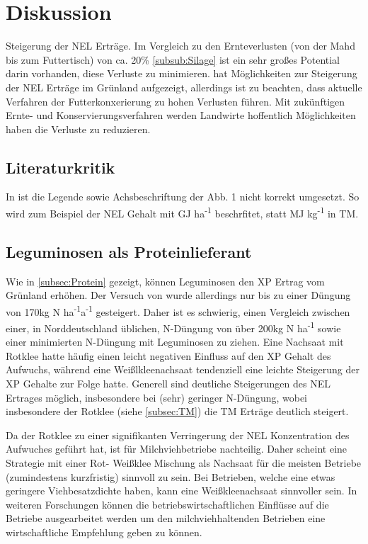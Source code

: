 
\section{Diskussion}
\label{sec:Disukussion}
Steigerung der \ac{NEL} Erträge.
Im Vergleich zu den Ernteverlusten (von der Mahd bis zum Futtertisch) von ca. 20\% \cref{subsub:Silage} ist ein sehr großes Potential darin vorhanden, diese Verluste zu minimieren.
\textcite[33-36]{weggler2050leguminosen} hat Möglichkeiten zur Steigerung der \ac{NEL} Erträge im Grünland aufgezeigt, allerdings ist zu beachten, dass aktuelle Verfahren der Futterkonxerierung zu hohen Verlusten führen.
Mit zukünftigen Ernte- und Konservierungsverfahren werden Landwirte hoffentlich Möglichkeiten haben die Verluste zu reduzieren.

\subsection{Literaturkritik}
\label{sub:kritik}
In \textcite[35]{weggler2050leguminosen} ist die Legende sowie Achsbeschriftung der Abb. 1 nicht korrekt umgesetzt.
So wird zum Beispiel der \ac{NEL} Gehalt mit GJ ha\textsuperscript{-1} beschrfitet, statt MJ kg\textsuperscript{-1} in \ac{TM}.

\subsection{Leguminosen als Proteinlieferant}
\label{sub:leguminosen}
Wie in \ref{subsec:Protein} gezeigt, können Leguminosen den \ac{XP} Ertrag vom Grünland erhöhen.
Der Versuch von \textcite[33-36]{weggler2050leguminosen} wurde allerdings nur bis zu einer Düngung von 170kg N ha\textsuperscript{-1}a\textsuperscript{-1} gesteigert.
Daher ist es schwierig, einen Vergleich zwischen einer, in Norddeutschland üblichen, N-Düngung von über 200kg N ha\textsuperscript{-1} sowie einer minimierten N-Düngung mit Leguminosen zu ziehen.
Eine Nachsaat mit Rotklee hatte häufig einen leicht negativen Einfluss auf den \ac{XP} Gehalt des Aufwuchs, während eine Weißlkleenachsaat tendenziell eine leichte Steigerung der \ac{XP} Gehalte zur Folge hatte.
Generell sind deutliche Steigerungen des \ac{NEL} Ertrages möglich, insbesondere bei (sehr) geringer N-Düngung, wobei insbesondere der Rotklee (siehe \ref{subsec:TM}) die \ac{TM} Erträge deutlich steigert.

Da der Rotklee zu einer signifikanten Verringerung der \ac{NEL} Konzentration des Aufwuches geführt hat, ist für Milchviehbetriebe nachteilig.
Daher scheint eine Strategie mit einer Rot- Weißklee Mischung als Nachsaat für die meisten Betriebe (zumindestens kurzfristig) sinnvoll zu sein.
Bei Betrieben, welche eine etwas geringere Viehbesatzdichte haben, kann eine Weißkleenachsaat sinnvoller sein.
In weiteren Forschungen können die betriebswirtschaftlichen Einflüsse auf die Betriebe ausgearbeitet werden um den milchviehhaltenden Betrieben eine wirtschaftliche Empfehlung geben zu können.


